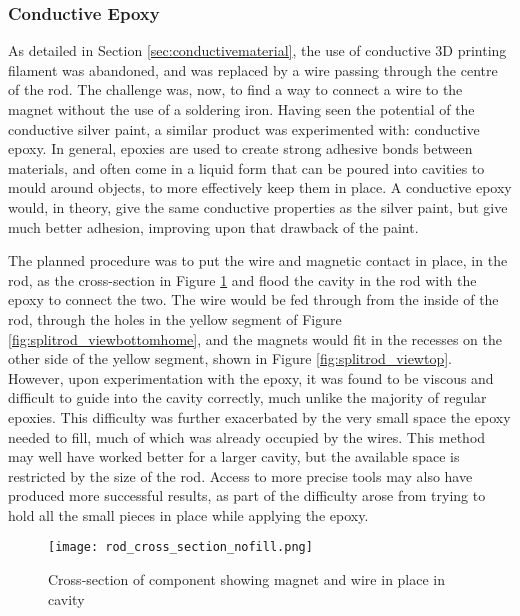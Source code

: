 \subsubsection{Conductive Epoxy}

As detailed in Section \ref{sec:conductivematerial}, the use of conductive 3D printing filament was abandoned, and was replaced by a wire passing through the centre of the rod. The challenge was, now, to find a way to connect a wire to the magnet without the use of a soldering iron. Having seen the potential of the conductive silver paint, a similar product was experimented with: conductive epoxy. In general, epoxies are used to create strong adhesive bonds between materials, and often come in a liquid form that can be poured into cavities to mould around objects, to more effectively keep them in place. A conductive epoxy would, in theory, give the same conductive properties as the silver paint, but give much better adhesion, improving upon that drawback of the paint. 

The planned procedure was to put the wire and magnetic contact in place, in the rod, as the cross-section in Figure \ref{fig:rod_cross_section_nofill} and flood the cavity in the rod with the epoxy to connect the two. The wire would be fed through from the inside of the rod, through the holes in the yellow segment of Figure \ref{fig:splitrod_viewbottomhome}, and the magnets would fit in the recesses on the other side of the yellow segment, shown in Figure \ref{fig:splitrod_viewtop}. However, upon experimentation with the epoxy, it was found to be viscous and difficult to guide into the cavity correctly, much unlike the majority of regular epoxies. This difficulty was further exacerbated by the very small space the epoxy needed to fill, much of which was already occupied by the wires. This method may well have worked better for a larger cavity, but the available space is restricted by the size of the rod. Access to more precise tools may also have produced more successful results, as part of the difficulty arose from trying to hold all the small pieces in place while applying the epoxy. 

\begin{figure}[H]
	\begin{center}
	\texttt{[image: rod\_cross\_section\_nofill.png]}\\ 
  	\caption{Cross-section of component showing magnet and wire in place in cavity}
    \label{fig:rod_cross_section_nofill}
    \end{center}
\end{figure}



